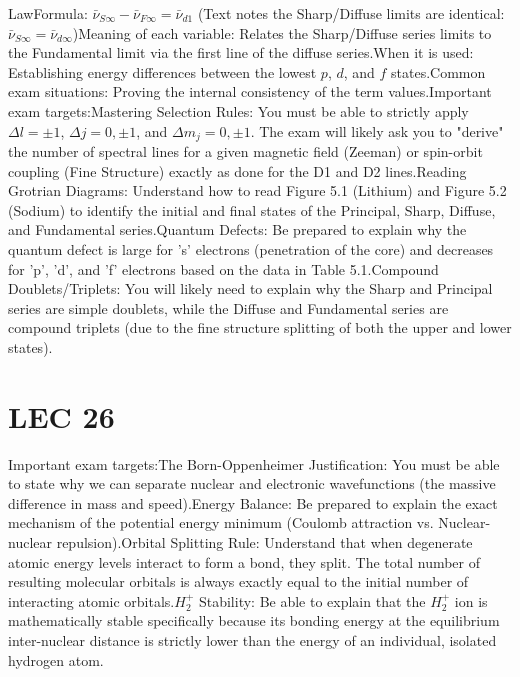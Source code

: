 \documentclass[11pt, a4paper]{report}
\begin{document}
LawFormula: $\bar{\nu}_{S\infty} - \bar{\nu}_{F\infty} = \bar{\nu}_{d1}$ (Text notes the Sharp/Diffuse limits are identical: $\bar{\nu}_{S\infty} = \bar{\nu}_{d\infty}$)Meaning of each variable: Relates the Sharp/Diffuse series limits to the Fundamental limit via the first line of the diffuse series.When it is used: Establishing energy differences between the lowest $p$, $d$, and $f$ states.Common exam situations: Proving the internal consistency of the term values.Important exam targets:Mastering Selection Rules: You must be able to strictly apply $\Delta l = \pm 1$, $\Delta j = 0, \pm 1$, and $\Delta m_j = 0, \pm 1$. The exam will likely ask you to "derive" the number of spectral lines for a given magnetic field (Zeeman) or spin-orbit coupling (Fine Structure) exactly as done for the D1 and D2 lines.Reading Grotrian Diagrams: Understand how to read Figure 5.1 (Lithium) and Figure 5.2 (Sodium) to identify the initial and final states of the Principal, Sharp, Diffuse, and Fundamental series.Quantum Defects: Be prepared to explain why the quantum defect is large for 's' electrons (penetration of the core) and decreases for 'p', 'd', and 'f' electrons based on the data in Table 5.1.Compound Doublets/Triplets: You will likely need to explain why the Sharp and Principal series are simple doublets, while the Diffuse and Fundamental series are compound triplets (due to the fine structure splitting of both the upper and lower states).

\chapter{LEC 26}
Important exam targets:The Born-Oppenheimer Justification: You must be able to state why we can separate nuclear and electronic wavefunctions (the massive difference in mass and speed).Energy Balance: Be prepared to explain the exact mechanism of the potential energy minimum (Coulomb attraction vs. Nuclear-nuclear repulsion).Orbital Splitting Rule: Understand that when degenerate atomic energy levels interact to form a bond, they split. The total number of resulting molecular orbitals is always exactly equal to the initial number of interacting atomic orbitals.$H_2^+$ Stability: Be able to explain that the $H_2^+$ ion is mathematically stable specifically because its bonding energy at the equilibrium inter-nuclear distance is strictly lower than the energy of an individual, isolated hydrogen atom.
\end{document}
